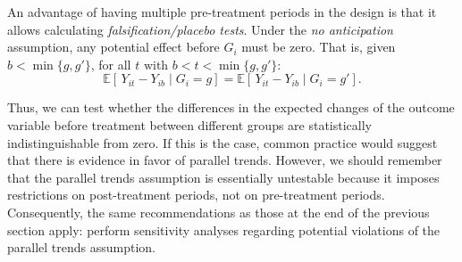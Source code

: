 %
%

An advantage of having multiple pre-treatment periods in the design is that it allows calculating \textit{falsification/placebo tests}. Under the \textit{no anticipation} assumption, any potential effect before $G_i$ must be zero. That is, given $b < \min\{g,g'\}$, for all $t \text{ with } b < t < \min\{g,g'\}$: 
\[
\mathbb{E}\!\left[\,Y_{it}-Y_{ib}\mid G_i=g\right]
=
\mathbb{E}\!\left[\,Y_{it}-Y_{ib}\mid G_i=g'\right].
\]

Thus, we can test whether the differences in the expected changes of the outcome variable before treatment between different groups are statistically indistinguishable from zero. If this is the case, common practice would suggest that there is evidence in favor of parallel trends. However, we should remember that the parallel trends assumption is essentially untestable because it imposes restrictions on post-treatment periods, not on pre-treatment periods. Consequently, the same recommendations as those at the end of the previous section apply: perform sensitivity analyses regarding potential violations of the parallel trends assumption.

